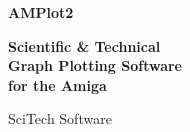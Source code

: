 \pagestyle{empty}

\Large
\vspace*{1.35in}
\centerline{\Huge\bf AMPlot2}
\vspace*{1ex}
\begin{center}
\bf Scientific \& Technical\\
Graph Plotting Software\\
for the Amiga
\end{center}
\vspace*{1ex}
\centerline{\sf SciTech Software}

